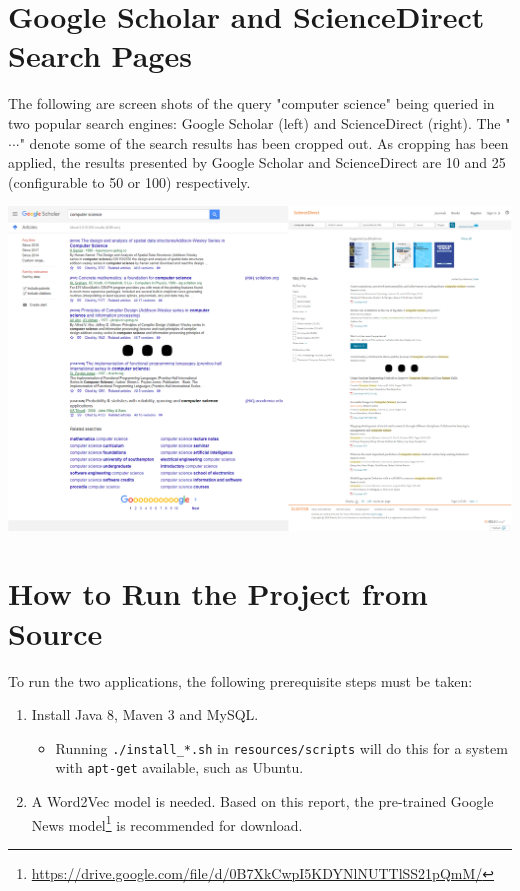 \begin{appendices}
\chapter{Google Scholar and ScienceDirect Search Pages}
\label{appendix:searcheg}
The following are screen shots of the query "computer science" being queried in two popular search engines: Google Scholar (left) and ScienceDirect (right). The "\textbf{$\cdot$$\cdot$$\cdot$}" denote some of the search results has been cropped out. As cropping has been applied, the results presented by Google Scholar and ScienceDirect are 10 and 25 (configurable to 50 or 100) respectively. \\
\begin{center}
	\includegraphics[width=\textwidth]{img/searchexamples.png}
\end{center}

\chapter{How to Run the Project from Source}
\label{appendix:howtorun}

To run the two applications, the following prerequisite steps must be taken:
\begin{enumerate}
	\item Install Java 8, Maven 3 and MySQL.
	\begin{itemize}
		\item Running \texttt{./install\_*.sh} in \texttt{resources/scripts} will do this for a system with \texttt{apt-get} available, such as Ubuntu.
	\end{itemize}
	\item A Word2Vec model is needed. Based on this report, the pre-trained Google News model\footnote{\href{https://drive.google.com/file/d/0B7XkCwpI5KDYNlNUTTlSS21pQmM/}{https://drive.google.com/file/d/0B7XkCwpI5KDYNlNUTTlSS21pQmM/}} is recommended for download.
\end{enumerate}


\end{appendices}
